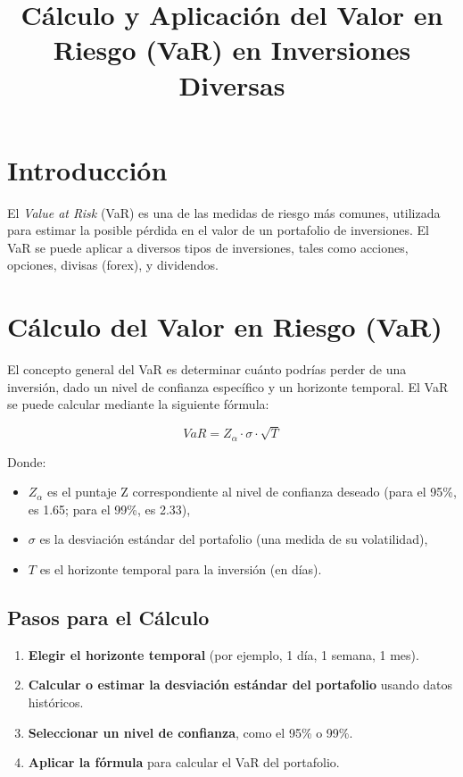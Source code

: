 \documentclass{article}
\title{Cálculo y Aplicación del Valor en Riesgo (VaR) en Inversiones Diversas}
\author{ }
\date{}
\begin{document}
\maketitle

\section{Introducción}

El \textit{Value at Risk} (VaR) es una de las medidas de riesgo más comunes, utilizada para estimar la posible pérdida en el valor de un portafolio de inversiones. El VaR se puede aplicar a diversos tipos de inversiones, tales como acciones, opciones, divisas (forex), y dividendos.

\section{Cálculo del Valor en Riesgo (VaR)}

El concepto general del VaR es determinar cuánto podrías perder de una inversión, dado un nivel de confianza específico y un horizonte temporal. El VaR se puede calcular mediante la siguiente fórmula:

\[
VaR = Z_{\alpha} \cdot \sigma \cdot \sqrt{T}
\]

Donde:
\begin{itemize}
    \item \( Z_{\alpha} \) es el puntaje Z correspondiente al nivel de confianza deseado (para el 95\%, es 1.65; para el 99\%, es 2.33),
    \item \( \sigma \) es la desviación estándar del portafolio (una medida de su volatilidad),
    \item \( T \) es el horizonte temporal para la inversión (en días).
\end{itemize}

\subsection{Pasos para el Cálculo}

\begin{enumerate}
    \item \textbf{Elegir el horizonte temporal} (por ejemplo, 1 día, 1 semana, 1 mes).
    \item \textbf{Calcular o estimar la desviación estándar del portafolio} usando datos históricos.
    \item \textbf{Seleccionar un nivel de confianza}, como el 95\% o 99\%.
    \item \textbf{Aplicar la fórmula} para calcular el VaR del portafolio.
\end{enumerate}
\end{document}

